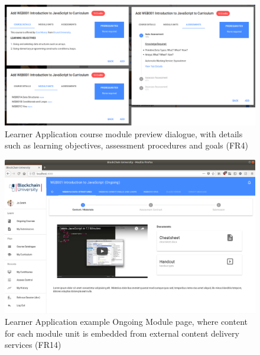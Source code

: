 \begin{figure}[!ht]
	\centering
	\includegraphics[width=1.05\textwidth]{Learner_cmdetails}
	\caption[Learner Application Course Module Preview Dialogue]
	{Learner Application course module preview dialogue, 
	with details such as learning objectives, assessment procedures and goals (FR4)}
	\label{fig:Learner_cmdetails}
\end{figure}

\begin{figure}[!ht]
	\centering
	\includegraphics[width=1.05\textwidth]{Learner_ongoing1}
	\caption[Learner Application example Ongoing Module page]
	{Learner Application example Ongoing Module page, where content for each module unit 
	is embedded from external content delivery services (FR14)}
	\label{fig:Learner_ongoing1}
\end{figure}

